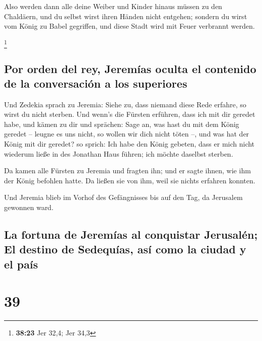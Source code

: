  Also werden dann alle deine Weiber und Kinder hinaus
müssen zu den Chaldäern, und du selbst wirst ihren Händen nicht
entgehen; sondern du wirst vom König zu Babel gegriffen, und diese Stadt
wird mit Feuer verbrannt werden.

\footnote{\textbf{38:23} Jer 32,4; Jer 34,3}

\hypertarget{por-orden-del-rey-jeremuxedas-oculta-el-contenido-de-la-conversaciuxf3n-a-los-superiores}{%
\subsection{Por orden del rey, Jeremías oculta el contenido de la
conversación a los
superiores}\label{por-orden-del-rey-jeremuxedas-oculta-el-contenido-de-la-conversaciuxf3n-a-los-superiores}}

 Und Zedekia sprach zu Jeremia: Siehe zu, dass niemand
diese Rede erfahre, so wirst du nicht sterben.  Und
wenn's die Fürsten erführen, dass ich mit dir geredet habe, und kämen zu
dir und sprächen: Sage an, was hast du mit dem König geredet -- leugne
es uns nicht, so wollen wir dich nicht töten --, und was hat der König
mit dir geredet?  so sprich: Ich habe den König gebeten,
dass er mich nicht wiederum ließe in des Jonathan Haus führen; ich
möchte daselbst sterben.

 Da kamen alle Fürsten zu Jeremia und fragten ihn; und er
sagte ihnen, wie ihm der König befohlen hatte. Da ließen sie von ihm,
weil sie nichts erfahren konnten.

 Und Jeremia blieb im Vorhof des Gefängnisses bis auf den
Tag, da Jerusalem gewonnen ward.

\hypertarget{la-fortuna-de-jeremuxedas-al-conquistar-jerusaluxe9n-el-destino-de-sedequuxedas-asuxed-como-la-ciudad-y-el-pauxeds}{%
\subsection{La fortuna de Jeremías al conquistar Jerusalén; El destino
de Sedequías, así como la ciudad y el
país}\label{la-fortuna-de-jeremuxedas-al-conquistar-jerusaluxe9n-el-destino-de-sedequuxedas-asuxed-como-la-ciudad-y-el-pauxeds}}

\hypertarget{section-38}{%
\section{39}\label{section-38}}

